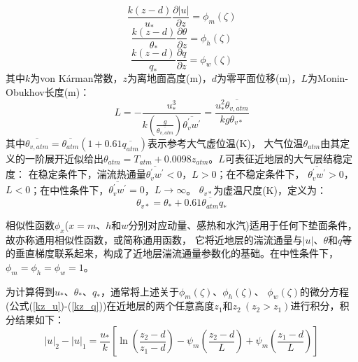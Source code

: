 \begin{equation}\label{kz_u}
\frac{k(z-d)}{u_{*}} \frac{\partial|u|}{\partial z}=\phi_{m}(\zeta)
\end{equation}
\begin{equation}\label{kz_theta}
\frac{k(z-d)}{\theta_{*}} \frac{\partial \theta}{\partial z}=\phi_{h}(\zeta)
\end{equation}
\begin{equation}\label{kz_q}
\frac{k(z-d)}{q_{*}} \frac{\partial q}{\partial z}=\phi_{w}(\zeta)
\end{equation}
其中$k$为von K\'arman常数，$z$为离地面高度(m)，$d$为零平面位移(m)，$L$为Monin-Obukhov长度(m)：
\begin{equation}\label{ObukL}
L=-\frac{u_{*}^{3}}{k\left(\frac{g}{\overline{\theta_{v, atm}}}\right) \overline{\theta_{v}^{\prime} w^{\prime}}}=\frac{u_{*}^{2} \overline{\theta_{v, atm}}}{k g \theta_{v *}}
\end{equation}
其中$\overline{\theta_{v,atm}}=\overline{\theta_{atm}}(1+0.61\overline{q_{atm}})$表示参考大气虚位温(K)，
 大气位温$\theta_{atm}$由其定义的一阶展开近似给出$\theta_{atm}=T_{atm}+0.0098z_{atm}$。$L$可表征近地层的大气层结稳定度：
 在稳定条件下，湍流热通量$\overline{\theta_v^\prime w^\prime}<0$，$L>0$；在不稳定条件下，
 $\overline{\theta_v^\prime w^\prime}>0$，$L<0$；在中性条件下，$\overline{\theta_v^\prime w^\prime}=0$，$L\rightarrow\infty$。
$\theta_{v\ast}$为虚温尺度(K)，定义为：
\begin{equation}\label{thvstar}
\theta_{v\ast}=\theta_\ast+0.61\overline{\theta_{atm}}q_\ast
\end{equation}

相似性函数$\phi_x$($x=m$、$h$和$w$分别对应动量、感热和水汽)适用于任何下垫面条件，故亦称通用相似性函数，或简称通用函数，
它将近地层的湍流通量与$\left|u\right|$、$\theta$和$q$等的垂直梯度联系起来，构成了近地层湍流通量参数化的基础。在中性条件下，$\phi_m=\phi_h=\phi_w=1$。



为计算得到$u_\ast$、$\theta_\ast$、$q_\ast$，通常将上述关于$\phi_m\left(\zeta\right)$、$\phi_h\left(\zeta\right)$、
$\phi_w(\zeta)$的微分方程(公式(\ref{kz_u})-(\ref{kz_q}))在近地层的两个任意高度$z_1$和$z_2\ (z_2>z_1)$进行积分，积分结果如下：
\begin{equation}
|u|_{2}-|u|_{1}=\frac{u_{*}}{k}\left[\ln \left(\frac{z_{2}-d}{z_{1}-d}\right)-\psi_{m}\left(\frac{z_{2}-d}{L}\right)+\psi_{m}\left(\frac{z_{1}-d}{L}\right)\right]
\end{equation}

